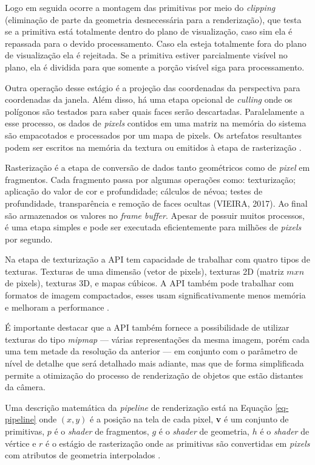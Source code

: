 Logo em seguida ocorre a montagem das primitivas por meio do \textit{clipping} (eliminação de parte da geometria desnecessária para a renderização), que testa se a primitiva está totalmente dentro do plano de visualização, caso sim ela é repassada para o devido processamento. Caso ela esteja totalmente fora do plano de visualização ela é rejeitada. Se a primitiva estiver parcialmente visível no plano, ela é dividida para que somente a porção visível siga para processamento.

Outra operação desse estágio é a projeção das coordenadas da perspectiva para coordenadas da janela. Além disso, há uma etapa opcional de \textit{culling} onde os polígonos são testados para saber quais faces serão descartadas. Paralelamente a esse processo, os dados de \textit{pixels} contidos em uma matriz na memória do sistema são empacotados e processados por um mapa de pixels. Os artefatos resultantes podem ser escritos na memória da textura ou emitidos à etapa de rasterização \cite{GLSLBook}.

Rasterização é a etapa de conversão de dados tanto geométricos como de \textit{pixel} em fragmentos. Cada fragmento passa por algumas operações como: texturização; aplicação do valor de cor e profundidade; cálculos de névoa; testes de profundidade, transparência e remoção de faces ocultas (VIEIRA, 2017). Ao final são armazenados os valores no \textit{frame buffer}. Apesar de possuir muitos processos, é uma etapa simples e pode ser executada eficientemente para milhões de \textit{pixels} por segundo.

Na etapa de texturização a API tem capacidade de trabalhar com quatro tipos de texturas. Texturas de uma dimensão (vetor de pixels), texturas 2D (matriz $ mxn $ de pixels), texturas 3D, e mapas cúbicos. A API também pode trabalhar com formatos de imagem compactados, esses usam significativamente menos memória e melhoram a performance \cite{GLSLBook}.

É importante destacar que a API também fornece a possibilidade de utilizar texturas do tipo \textit{mipmap} --- várias representações da mesma imagem, porém cada uma tem metade da resolução da anterior --- em conjunto com o parâmetro de nível de detalhe que será detalhado mais adiante, mas que de forma simplificada permite a otimização do processo de renderização de objetos que estão distantes da câmera. 

Uma descrição matemática da \textit{pipeline} de renderização está na Equação \ref{eq-pipeline} onde $ (x, y) $ é a posição na tela de cada pixel, \textbf{v} é um conjunto de primitivas, $ p $ é o \textit{shader} de fragmentos, $ g $ é o \textit{shader} de geometria, $ h $ é o \textit{shader} de vértice e $ r $ é o estágio de rasterização onde as primitivas são convertidas em \textit{pixels} com atributos de geometria interpolados \cite{wang2014auto}.

